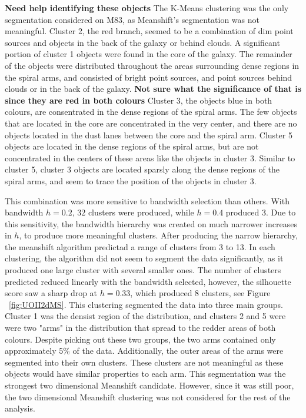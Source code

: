 \textbf{Need help identifying these objects}
The K-Means clustering was the only segmentation considered on M83, as Meanshift's segmentation was not meaningful.
Cluster 2, the red branch, seemed to be a combination of dim point sources and objects in the back of the galaxy or behind clouds.
A significant portion of cluster 1 objects were found in the core of the galaxy.
The remainder of the objects were distributed throughout the areas surrounding dense regions in the spiral arms, and consisted of bright point sources, and point sources behind clouds or in the back of the galaxy. \textbf{Not sure what the significance of that is since they are red in both colours}
Cluster 3, the objects blue in both colours, are consentrated in the dense regions of the spiral arms.
The few objects that are located in the core are concentrated in the very center, and there are no objects located in the dust lanes between the core and the spiral arm.
Cluster 5 objects are located in the dense regions of the spiral arms, but are not concentrated in the centers of these areas like the objects in cluster 3.
Similar to cluster 5, cluster 3 objects are located sparsly along the dense regions of the spiral arms, and seem to trace the position of the objects in cluster 3. 

This combination was more sensitive to bandwidth selection than others.
With bandwidth $h=0.2$, $32$ clusters were produced, while $h=0.4$ produced $3$.
Due to this sensitivity, the bandwidth hierarchy was created on much narrower increases in $h$, to produce more meaningful clusters.
After producing the narrow hierarchy, the meanshift algorithm predictad a range of clusters from 3 to 13.
In each clustering, the algorithm did not seem to segment the data significantly, as it produced one large cluster with several smaller ones.
The number of clusters predicted reduced linearly with the bandwidth selected, however, the silhouette score saw a sharp drop at $h = 0.33$, which produced 8 clusters, see Figure ~\ref{fig:UOII2dMS}. 
This clustering segmented the data into three main groups.
Cluster 1 was the densist region of the distribution, and clusters 2 and 5 were were two "arms" in the distribution that spread to the redder areas of both colours.
Despite picking out these two groups, the two arms contained only approximately 5\% of the data. 
Additionally, the outer areas of the arms were segmented into their own clusters. 
These clusters are not meaningful as these objects would have similar properties to each arm.
This segmentation was the strongest two dimensional Meanshift candidate. 
However, since it was still poor, the two dimensional Meanshift clustering was not considered for the rest of the analysis. 


